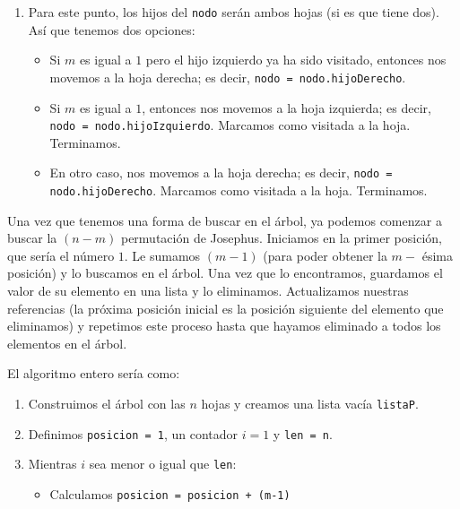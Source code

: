 \documentclass[letterpaper,11pt]{article}
\begin{document}
\begin{enumerate}
\begin{enumerate}
\begin{enumerate}
            \item Para este punto, los hijos del \texttt{nodo} serán ambos 
            hojas (si es que tiene dos). Así que tenemos dos opciones:
            \begin{itemize}
                \item Si $m$ es igual a $1$ pero el hijo izquierdo ya ha sido 
                visitado, entonces nos movemos a la hoja derecha; es decir, 
                \texttt{nodo = nodo.hijoDerecho}.

                \item Si $m$ es igual a $1$, entonces nos movemos a la 
                hoja izquierda; es decir, \\ 
                \texttt{nodo = nodo.hijoIzquierdo}. Marcamos como visitada a 
                la hoja. Terminamos.

                \item En otro caso, nos movemos a la hoja derecha; es decir, 
                \texttt{nodo = nodo.hijoDerecho}. Marcamos como visitada a la 
                hoja. Terminamos. 
            \end{itemize}
        \end{enumerate}

        Una vez que tenemos una forma de buscar en el árbol, ya podemos comenzar 
        a buscar la $(n-m)$ permutación de Josephus. Iniciamos en la primer 
        posición, que sería el número $1$. Le sumamos $(m-1)$ (para poder obtener 
        la $m-$ ésima posición) y lo buscamos en el árbol. Una vez que lo encontramos, 
        guardamos el valor de su elemento en una lista y lo eliminamos. Actualizamos 
        nuestras referencias (la próxima posición inicial es la posición siguiente del 
        elemento que eliminamos) y repetimos este proceso hasta que hayamos eliminado 
        a todos los elementos en el árbol.

        El algoritmo entero sería como:
        \begin{enumerate}
            \item Construimos el árbol con las $n$ hojas y creamos una lista 
            vacía \texttt{listaP}.

            \item Definimos \texttt{posicion = 1}, un contador $i = 1$ y 
            \texttt{len = n}.

            \item Mientras $i$ sea menor o igual que \texttt{len}:
            \begin{itemize}
                \item Calculamos \texttt{posicion = posicion + (m-1)}


\end{itemize}
\end{enumerate}
\end{enumerate}
\end{enumerate}
\end{document}
